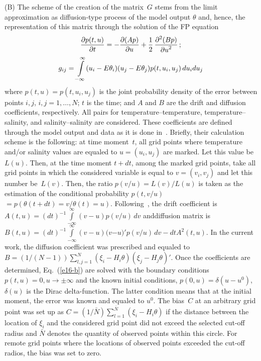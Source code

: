 \begin{multicols}{2}
(B) The scheme of the creation of the matrix~$G$ stems from the limit approximation 
as diffusion-type process of the model output $\theta $ and, hence, the representation 
of this matrix through the solution of the FP equation
\begin{gather}
\displaystyle\frac{\displaystyle \partial p(t,u)\mathstrut}{\displaystyle \partial t\mathstrut} =-\displaystyle\frac{\displaystyle \partial (Ap)\mathstrut}{\displaystyle \partial u\mathstrut} +\displaystyle\frac{\displaystyle 1\mathstrut}{\displaystyle 2\mathstrut}\,
\displaystyle\frac{\displaystyle \partial ^{2} (Bp)\mathstrut}{\displaystyle \partial u^{2} \mathstrut} \,;
\label{e16-b}
\\
g_{ij} =\int\limits_{-\infty }^{\infty }(u_{i} -E\theta_{i}  )
(u_{j} -E\theta_{j} )p(t,u_{i} ,u_{j} )\,du_{i} du_{j} \notag
\end{gather}
where $p(t,u)=p(t,u_{i} ,u_{j} )$ is the joint probability density of the error between 
points $i,j$, $i,j=1,\ldots ,N$; $t$ is the time; and $A$ and $B$ are the drift and diffusion 
coefficients, respectively. All pairs for temperature--temperature, temperature--salinity, 
and salinity--salinity are considered. These coefficients are defined through the model 
output and data as it is done in~\cite{6-b}. Briefly, their calculation scheme is the following: 
at time moment~$t$, all grid points where temperature and/or salinity values are equaled 
to $u=(u_{i} ,u_{j} )$ are marked. Let this value be $L(u)$. Then, at the time moment
$t +dt$, among the marked grid points, take all grid points in which the considered 
variable is equal to $v=(v_{i} ,v_{j} )$ and let this number be~$L(v)$. 
Then, the ratio ${p(v/u)=L(v)/L(u)}$ is taken as the\linebreak
estimation of the conditional 
probability $p(t,v/u)$\linebreak $=p(\theta (t+dt)=v/\theta (t)=u).$ 
Following~\cite{4-b}, the drift coefficient is 
$A(t,u)=(dt)^{-1} \int\limits_{-\infty }^{\infty }(v-u )p(v/u)\,dv$ 
and\linebreak diffusion matrix is $B(t,u)=(dt)^{-1} \int\limits_{-\infty }^{\infty }
(v-u )(v$\linebreak $-u)'p(v/u)\,dv- dtA^{2} (t,u)$.
In the current work, the diffusion coefficient was prescribed and 
equaled to $B=({1}/(N-1)) \sum\limits_{l,j=1}^{N}(\xi_{i}  -H_{i} \theta )(\xi_{j} -H_{j} 
\theta )'$. Once the coefficients are determined, Eq.~(\ref{e16-b}) are solved with the boundary 
conditions $p(t,u)=0,u\to \pm \infty $ and the known initial conditions, 
$p(0,u)=\delta (u-u^{0} )$, $\delta (u)$ is the Dirac delta-function. 
The latter condition means that at the initial moment, the error was known and 
equaled to $u^{0} $. The bias~$C$ at an arbitrary grid point was set up 
as  $C=({1}/{\bar{N}}) \sum\limits_{l=1}^{\bar{N}}(\xi_{i}  -H_{i} \theta )$ 
if the distance between the location of $\xi_{i} $ and the considered grid point 
did not exceed the selected cut-off radius and $\bar{N}$ denotes the quantity 
of observed points within this circle. For remote grid points where the locations 
of observed points exceeded the cut-off radios, the bias was set to zero.


\end{multicols}
